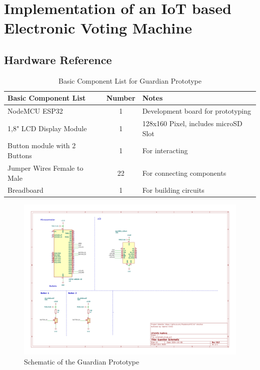 \chapter{Implementation of an IoT based Electronic Voting Machine}

\section{Hardware Reference}

\begin{table}[h!]
    \centering
    \begin{tabular}{|l|c|p{5cm}|}
        \hline
        \textbf{Basic Component List} & \textbf{Number} & \textbf{Notes} \\
        \hline
        NodeMCU ESP32  & 1 & Development board for prototyping \\
        \hline
        1,8" LCD Display Module  & 1 & 128x160 Pixel, includes microSD Slot \\
        \hline
        Button module with 2 Buttons & 1 & For interacting \\
        \hline
		Jumper Wires Female to Male & 22 & For connecting components \\
        \hline
        Breadboard & 1 & For building circuits \\
        \hline
    \end{tabular}
    \caption{Basic Component List for Guardian Prototype}\label{tab:basic-component-list}
\end{table}

\begin{figure}
	\centering
	\includegraphics[scale=.5]{abbildungen/schematic.png}
	\caption{Schematic of the Guardian Prototype}\label{Fig:schematic} 
\end{figure}

